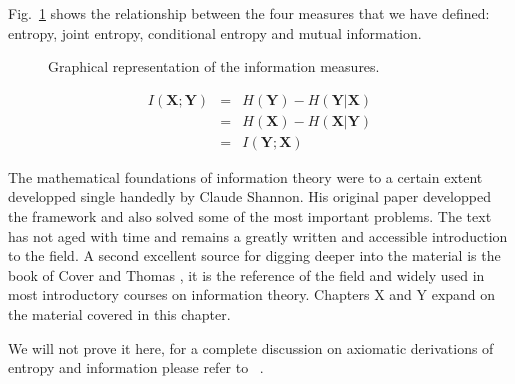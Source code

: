 Fig.~\ref{fig:infmeasures} shows the relationship between the four measures that we have defined: entropy, joint entropy, conditional entropy and mutual information.

\begin{figure}
\begin{center}
\def\svgwidth{.8\columnwidth} 
 
\caption{Graphical representation of the information measures.}
\label{fig:infmeasures}
\end{center}
\end{figure}

\begin{eqnarray}
\label{eq:mutualinformation}
I(\mathbf{X};\mathbf{Y}) &=& H(\mathbf{Y}) - H(\mathbf{Y}|\mathbf{X}) \nonumber\\
         &=& H(\mathbf{X}) - H(\mathbf{X}|\mathbf{Y}) \nonumber\\
         &=& I(\mathbf{Y};\mathbf{X})
\end{eqnarray}

The mathematical foundations of information theory were to a certain extent developped single handedly by Claude Shannon. His original paper \cite{} developped the framework and also solved some of the most important problems. The text has not aged with time and remains a greatly written and accessible introduction to the field. A second excellent source for digging deeper into the material is the book of Cover and Thomas \cite{}, it is the reference of the field and widely used in most introductory courses on information theory. Chapters X and Y expand on the material covered in this chapter.

We will not prove it here, for a complete discussion on axiomatic derivations of entropy and information please refer to~ \cite{Aczel_74,Aczel_75,Csiszar_08,Feinstein_58}. 

